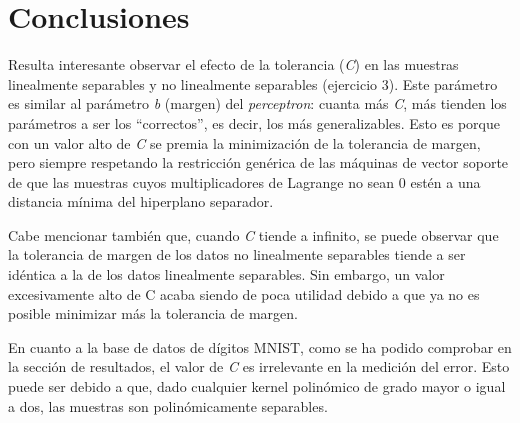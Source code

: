 \documentclass[a4paper]{article}
\begin{document}
\section{Conclusiones}
\quad Resulta interesante observar el efecto de la tolerancia (\textit{C}) en las muestras linealmente separables y no linealmente separables (ejercicio 3). Este parámetro es similar al parámetro \textit{b} (margen) del \textit{perceptron}: cuanta más \textit{C}, más tienden los parámetros a ser los “correctos”, es decir, los más generalizables. Esto es porque con un valor alto de \textit{C} se premia la minimización de la tolerancia de margen, pero siempre respetando la restricción genérica de las máquinas de vector soporte de que las muestras cuyos multiplicadores de Lagrange no sean 0 estén a una distancia mínima del hiperplano separador.

\quad Cabe mencionar también que, cuando \textit{C} tiende a infinito, se puede observar que la tolerancia de margen de los datos no linealmente separables tiende a ser idéntica a la de los datos linealmente separables. Sin embargo, un valor excesivamente alto de C acaba siendo de poca utilidad debido a que ya no es posible minimizar más la tolerancia de margen.


\quad En cuanto a la base de datos de dígitos MNIST, como se ha podido comprobar en la sección de resultados, el valor de \textit{C} es irrelevante en la medición del error. Esto puede ser debido a que, dado cualquier kernel polinómico de grado mayor o igual a dos, las muestras son polinómicamente separables.
\end{document}
